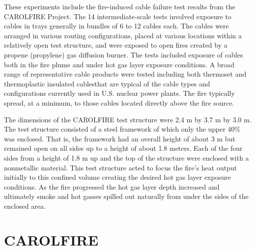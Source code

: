 \documentclass[11pt]{book}
\begin{document}

These experiments include the fire-induced cable failure test results
from the CAROLFIRE Project. The 14 intermediate-scale tests involved
exposure to cables in trays generally in bundles of 6 to 12 cables each. The
cables were arranged in various routing configurations, placed at various
locations within a relatively open test structure, and were exposed to
open fires created by a propene (propylene) gas diffusion burner. The
tests included exposure of cables both in the fire plume and under
hot gas layer exposure conditions. A broad range of representative
cable products were tested including both thermoset and thermoplastic
insulated cablesthat are typical of the cable types and configurations
currently used in U.S. nuclear power plants. The fire typically spread,
at a minimum, to those cables located directly above the fire source.

The dimensions of the CAROLFIRE test structure were
2.4 m by 3.7 m by 3.0 m. The test structure consisted of
a steel framework of which only the upper 40\% was enclosed.
That is, the framework had an overall height of about 3 m
but remained open on all sides up to a height of about 1.8 meters.
Each of the four sides from a height of 1.8 m up and
the top of the structure were enclosed with a nonmetallic
material. This test structure acted to focus the fire's heat output
initially to this confined volume creating the desired hot gas layer
exposure conditions. As the fire progressed the hot gas layer depth
increased and ultimately smoke and hot gasses spilled out naturally
from under the sides of the enclosed area.






\clearpage


\section{CAROLFIRE}
\end{document}
